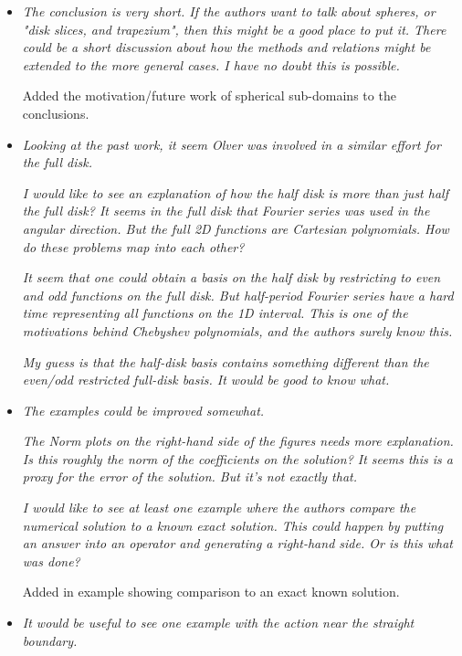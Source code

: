 \documentclass[10pt]{letter}
\newcommand{\comment}[1]{\textit{\color{bluey}#1}}
\newcommand{\bstodoinline}{\todo[color=pink,inline=true]}
\begin{document}
\begin{itemize}[parsep=1em,leftmargin=1em]
\item \comment{The conclusion is very short. If the authors want to talk about spheres, or "disk slices, and trapezium", then this might be a good place to put it. There could be a short discussion about how the methods and relations might be extended to the more general cases. I have no doubt this is possible.}

Added the motivation/future work of spherical sub-domains to the conclusions.


\item \comment{Looking at the past work, it seem Olver was involved in a similar effort for the full disk.}

\comment{I would like to see an explanation of how the half disk is more than just half the full disk? It seems in the full disk that Fourier series was used in the angular direction. But the full 2D functions are Cartesian polynomials. How do these problems map into each other? }

\comment{It seem that one could obtain a basis on the half disk by restricting to even and odd functions on the full disk. But half-period Fourier series have a hard time representing all functions on the 1D interval. This is one of the motivations behind Chebyshev polynomials, and the authors surely know this.} 

\comment{My guess is that the half-disk basis contains something different than the even/odd restricted full-disk basis. It would be good to know what.}

\bstodoinline{I am not to sure how to address this comment.}


\item \comment{The examples could be improved somewhat.}

\comment{The Norm plots on the right-hand side of the figures needs more explanation. Is this roughly the norm of the coefficients on the solution? It seems this is a proxy for the error of the solution. But it's not exactly that. }

\comment{I would like to see at least one example where the authors compare the numerical solution to a known exact solution. This could happen by putting an answer into an operator and generating a right-hand side. Or is this what was done?}

Added in example showing comparison to an exact known solution.


\item \comment{It would be useful to see one example with the action near the straight boundary. }


\end{itemize}
\end{document}

